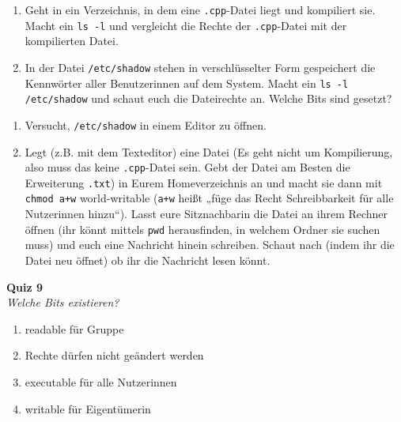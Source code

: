 \begin{praxis}
	\begin{enumerate}
		\item Geht in ein Verzeichnis, in dem eine \texttt{.cpp}-Datei liegt und
		      kompiliert sie. Macht ein \texttt{ls -l} und vergleicht die Rechte der
		      \texttt{.cpp}-Datei mit der kompilierten Datei.
		\item In der Datei \texttt{/etc/shadow} stehen in verschlüsselter Form
		      gespeichert die Kennwörter aller Benutzerinnen auf dem System. Macht ein
		      \texttt{ls -l /etc/shadow} und schaut euch die Dateirechte an. Welche
		      Bits sind gesetzt?
	\end{enumerate}
\end{praxis}

\begin{spiel}
	\begin{enumerate}
		\item Versucht, \texttt{/etc/shadow} in einem Editor zu öffnen.
		\item Legt (z.B. mit dem Texteditor) eine Datei (Es geht nicht um
		      Kompilierung, also muss das keine \texttt{.cpp}-Datei sein. Gebt der
		      Datei am Besten die Erweiterung \texttt{.txt}) in Eurem Homeverzeichnis
		      an und macht sie dann mit \texttt{chmod a+w} world-writable
		      (\texttt{a+w} heißt „füge das Recht Schreibbarkeit für alle Nutzerinnen
		      hinzu“).  Lasst eure Sitznachbarin die Datei an ihrem Rechner öffnen
		      (ihr könnt mittels \texttt{pwd} herausfinden, in welchem Ordner sie
		      suchen muss) und euch eine Nachricht hinein schreiben. Schaut nach
		      (indem ihr die Datei neu öffnet) ob ihr die Nachricht lesen könnt.
	\end{enumerate}
\end{spiel}

\textbf{Quiz 9}\\
\textit{Welche Bits existieren?}
\begin{enumerate}[label=\alph*)]
	\item readable für Gruppe
	\item Rechte dürfen nicht geändert werden
	\item executable für alle Nutzerinnen
	\item writable für Eigentümerin
\end{enumerate}
